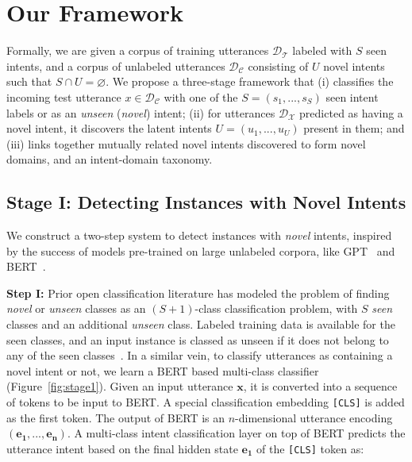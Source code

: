 \section{Our Framework \mname{}}


Formally, we are given a corpus of training utterances $\mathcal{D_T}$ labeled with $S$ seen intents, and a corpus of unlabeled utterances $\mathcal{D_C}$ consisting of $U$ novel intents such that $S \cap U = \varnothing$. We propose a three-stage framework \mbox{\mname{}} that (i) classifies the incoming test utterance $x \in \mathcal{D_C}$ with one of the $S = (s_1, ..., s_S)$ seen intent labels or as an \textit{unseen} (\textit{novel}) intent; (ii) for utterances $\mathcal{D_X}$ predicted as having a novel intent, it discovers the latent intents $U = (u_1, ..., u_U)$ present in them; and (iii) links together mutually related novel intents discovered to form novel domains, and an intent-domain taxonomy. %


\subsection{Stage I: Detecting Instances with Novel Intents}
\label{sec:stage1}

We construct a two-step system to detect instances with \textit{novel} intents, inspired by the success of models pre-trained on large unlabeled corpora, like GPT~\cite{radford2018improving} and BERT~\cite{devlin2018bert}. 

\smallskip
\noindent \textbf{Step I:} 
Prior open classification literature has modeled the problem of finding \textit{novel} or \textit{unseen} classes as an $(S+1)$-class  classification problem, with $S$ \textit{seen} classes and an additional \textit{unseen} class. Labeled training data is available for the seen classes, and an input instance is classed as unseen if it does not belong to any of the seen classes~\cite{xu2019open,shu2018unseen,shu2017doc}. 
In a similar vein, to classify utterances as containing a novel intent or not, we learn a BERT based multi-class classifier (Figure~\ref{fig:stage1}). 
Given an input utterance $\bm{x}$, it is converted into a sequence of tokens to be input to BERT. A special classification embedding \texttt{[CLS]} is added as the first token. %
The output of BERT is an $n$-dimensional utterance encoding $(\bm{e_1},...,\bm{e_n})$. A multi-class intent classification layer on top of BERT predicts the utterance intent based on the final hidden state $\bm{e_1}$ of the \texttt{[CLS]} token as: 

